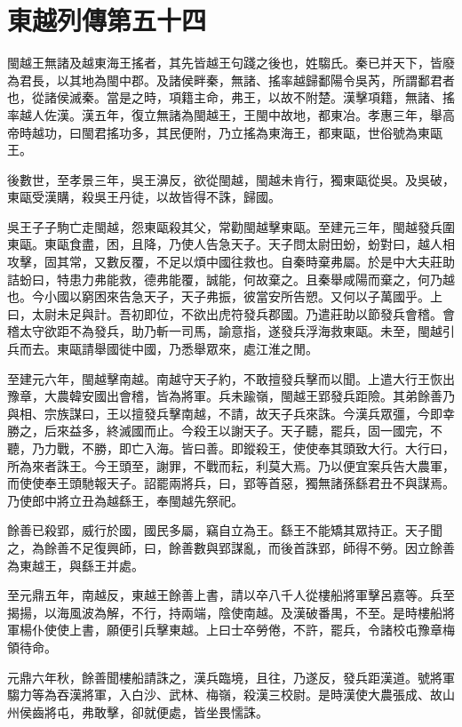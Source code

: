 \chapter{東越列傳第五十四}

閩越王無諸及越東海王搖者，其先皆越王句踐之後也，姓騶氏。秦已并天下，皆廢為君長，以其地為閩中郡。及諸侯畔秦，無諸、搖率越歸鄱陽令吳芮，所謂鄱君者也，從諸侯滅秦。當是之時，項籍主命，弗王，以故不附楚。漢擊項籍，無諸、搖率越人佐漢。漢五年，復立無諸為閩越王，王閩中故地，都東冶。孝惠三年，舉高帝時越功，曰閩君搖功多，其民便附，乃立搖為東海王，都東甌，世俗號為東甌王。

後數世，至孝景三年，吳王濞反，欲從閩越，閩越未肯行，獨東甌從吳。及吳破，東甌受漢購，殺吳王丹徒，以故皆得不誅，歸國。

吳王子子駒亡走閩越，怨東甌殺其父，常勸閩越擊東甌。至建元三年，閩越發兵圍東甌。東甌食盡，困，且降，乃使人告急天子。天子問太尉田蚡，蚡對曰，越人相攻擊，固其常，又數反覆，不足以煩中國往救也。自秦時棄弗屬。於是中大夫莊助詰蚡曰，特患力弗能救，德弗能覆，誠能，何故棄之。且秦舉咸陽而棄之，何乃越也。今小國以窮困來告急天子，天子弗振，彼當安所告愬。又何以子萬國乎。上曰，太尉未足與計。吾初即位，不欲出虎符發兵郡國。乃遣莊助以節發兵會稽。會稽太守欲距不為發兵，助乃斬一司馬，諭意指，遂發兵浮海救東甌。未至，閩越引兵而去。東甌請舉國徙中國，乃悉舉眾來，處江淮之閒。

至建元六年，閩越擊南越。南越守天子約，不敢擅發兵擊而以聞。上遣大行王恢出豫章，大農韓安國出會稽，皆為將軍。兵未踰嶺，閩越王郢發兵距險。其弟餘善乃與相、宗族謀曰，王以擅發兵擊南越，不請，故天子兵來誅。今漢兵眾彊，今即幸勝之，后來益多，終滅國而止。今殺王以謝天子。天子聽，罷兵，固一國完，不聽，乃力戰，不勝，即亡入海。皆曰善。即鏦殺王，使使奉其頭致大行。大行曰，所為來者誅王。今王頭至，謝罪，不戰而耘，利莫大焉。乃以便宜案兵告大農軍，而使使奉王頭馳報天子。詔罷兩將兵，曰，郢等首惡，獨無諸孫繇君丑不與謀焉。乃使郎中將立丑為越繇王，奉閩越先祭祀。

餘善已殺郢，威行於國，國民多屬，竊自立為王。繇王不能矯其眾持正。天子聞之，為餘善不足復興師，曰，餘善數與郢謀亂，而後首誅郢，師得不勞。因立餘善為東越王，與繇王并處。

至元鼎五年，南越反，東越王餘善上書，請以卒八千人從樓船將軍擊呂嘉等。兵至揭揚，以海風波為解，不行，持兩端，陰使南越。及漢破番禺，不至。是時樓船將軍楊仆使使上書，願便引兵擊東越。上曰士卒勞倦，不許，罷兵，令諸校屯豫章梅領待命。

元鼎六年秋，餘善聞樓船請誅之，漢兵臨境，且往，乃遂反，發兵距漢道。號將軍騶力等為吞漢將軍，入白沙、武林、梅嶺，殺漢三校尉。是時漢使大農張成、故山州侯齒將屯，弗敢擊，卻就便處，皆坐畏懦誅。

